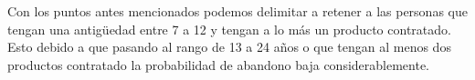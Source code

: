 \documentclass[../main.tex]{subfiles}
\begin{document}
Con los puntos antes mencionados podemos delimitar a retener a las personas que tengan una antigüedad entre 7 a 12 y tengan a lo más un producto contratado. Esto debido a que pasando al rango de 13 a 24 años o que tengan al menos dos productos contratado la probabilidad de abandono baja considerablemente.
\end{document}
